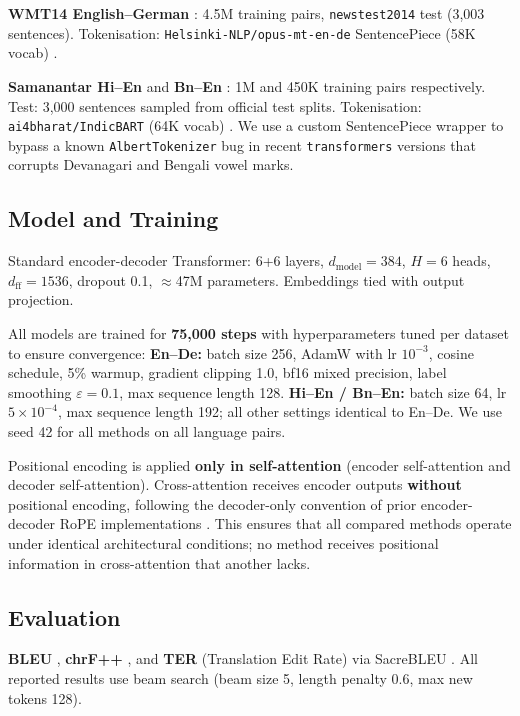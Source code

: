 \documentclass[conference]{IEEEtran}
\begin{document}
\textbf{WMT14 English--German} \cite{bojar2014wmt}: 4.5M training pairs,
\texttt{newstest2014} test (3,003 sentences). Tokenisation:
\texttt{Helsinki-NLP/opus-mt-en-de} SentencePiece (58K vocab) \cite{tiedemann2020opus}.

\textbf{Samanantar Hi--En} and \textbf{Bn--En}
\cite{ramesh2022samanantar}: 1M and 450K training pairs respectively.
Test: 3,000 sentences sampled from official test splits.
Tokenisation: \texttt{ai4bharat/IndicBART} (64K vocab) \cite{dabre2021indicbart}.
We use a custom SentencePiece wrapper to bypass a known
\texttt{AlbertTokenizer} bug in recent \texttt{transformers} versions that
corrupts Devanagari and Bengali vowel marks.

\subsection{Model and Training}

Standard encoder-decoder Transformer: 6+6 layers, $d_{\text{model}}=384$,
$H=6$ heads, $d_{\text{ff}}=1536$, dropout 0.1, $\approx$47M parameters.
Embeddings tied with output projection.

All models are trained for \textbf{75,000 steps} with hyperparameters tuned
per dataset to ensure convergence:
\textbf{En--De:} batch size 256, AdamW
\cite{loshchilov2018decoupled} with lr $10^{-3}$, cosine schedule, 5\%
warmup, gradient clipping 1.0, bf16 mixed precision, label smoothing
$\varepsilon=0.1$, max sequence length 128.
\textbf{Hi--En / Bn--En:} batch size 64, lr $5 \times 10^{-4}$,
max sequence length 192; all other settings identical to En--De.
We use seed 42 for all methods on all language pairs.

Positional encoding is applied \textbf{only in self-attention}
(encoder self-attention and decoder self-attention). Cross-attention
receives encoder outputs \textbf{without} positional encoding, following
the decoder-only convention of prior encoder-decoder RoPE
implementations \cite{su2021roformer}. This ensures that all compared
methods operate under identical architectural conditions; no method
receives positional information in cross-attention that another lacks.

\subsection{Evaluation}

\textbf{BLEU} \cite{papineni2002bleu}, \textbf{chrF++}
\cite{popovic2015chrf}, and \textbf{TER} (Translation Edit Rate) \cite{snover2006study}
via SacreBLEU \cite{post2018sacrebleu}. All reported results use beam search
(beam size 5, length penalty 0.6, max new tokens 128).
\end{document}
